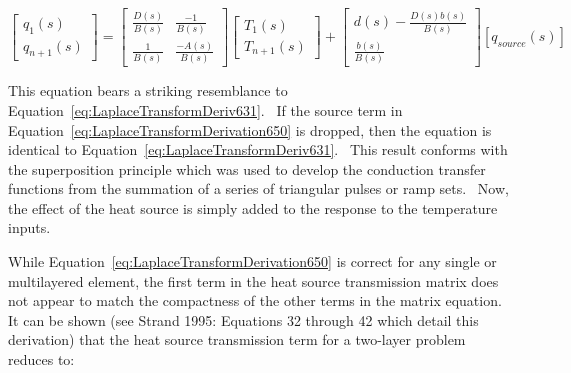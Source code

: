 \begin{equation}
\left[ {\begin{array}{ccc}{{q_1}\left( s \right)}\\ {{q_{n + 1}}\left( s \right)}\end{array}} \right] = \left[ {\begin{array}{ccc}{\frac{{D\left( s \right)}}{{B\left( s \right)}}}&{\frac{{ - 1}}{{B\left( s \right)}}}\\ {\frac{1}{{B\left( s \right)}}}&{\frac{{ - A\left( s \right)}}{{B\left( s \right)}}}\end{array}} \right]\left[ {\begin{array}{ccc}{{T_1}\left( s \right)}\\ {{T_{n + 1}}\left( s \right)}\end{array}} \right] + \left[ {\begin{array}{ccc}{d\left( s \right) - \frac{{D\left( s \right)b\left( s \right)}}{{B\left( s \right)}}}\\ {\frac{{b\left( s \right)}}{{B\left( s \right)}}}\end{array}} \right]\left[ {{q_{source}}\left( s \right)} \right]
\label{eq:LaplaceTransformDerivation650}
\end{equation}

This equation bears a striking resemblance to Equation~\ref{eq:LaplaceTransformDeriv631}.~ If the source term in Equation~\ref{eq:LaplaceTransformDerivation650} is dropped, then the equation is identical to Equation~\ref{eq:LaplaceTransformDeriv631}.~ This result conforms with the superposition principle which was used to develop the conduction transfer functions from the summation of a series of triangular pulses or ramp sets.~ Now, the effect of the heat source is simply added to the response to the temperature inputs.

While Equation~\ref{eq:LaplaceTransformDerivation650} is correct for any single or multilayered element, the first term in the heat source transmission matrix does not appear to match the compactness of the other terms in the matrix equation.~ It can be shown (see Strand 1995: Equations 32 through 42 which detail this derivation) that the heat source transmission term for a two-layer problem reduces to:

